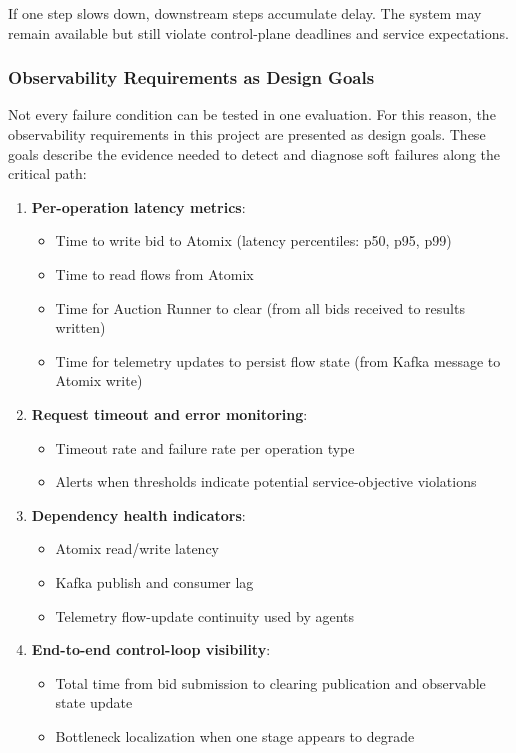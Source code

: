 If one step slows down, downstream steps accumulate delay. The system may remain available but still violate control-plane deadlines and service expectations.

\subsubsection{Observability Requirements as Design Goals}

Not every failure condition can be tested in one evaluation. For this reason, the observability requirements in this project are presented as design goals. These goals describe the evidence needed to detect and diagnose soft failures along the critical path:

\begin{enumerate}
    \item \textbf{Per-operation latency metrics}:
    \begin{itemize}
        \item Time to write bid to Atomix (latency percentiles: p50, p95, p99)
        \item Time to read flows from Atomix
        \item Time for Auction Runner to clear (from all bids received to results written)
        \item Time for telemetry updates to persist flow state (from Kafka message to Atomix write)
    \end{itemize}
    
    \item \textbf{Request timeout and error monitoring}:
    \begin{itemize}
        \item Timeout rate and failure rate per operation type
        \item Alerts when thresholds indicate potential service-objective violations
    \end{itemize}
    
    \item \textbf{Dependency health indicators}:
    \begin{itemize}
        \item Atomix read/write latency
        \item Kafka publish and consumer lag
        \item Telemetry flow-update continuity used by agents
    \end{itemize}
    
    \item \textbf{End-to-end control-loop visibility}:
    \begin{itemize}
        \item Total time from bid submission to clearing publication and observable state update
        \item Bottleneck localization when one stage appears to degrade
    \end{itemize}
\end{enumerate}

